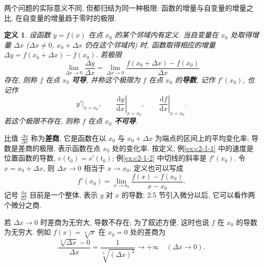 \documentclass[UTF8,openany]{ctexbook}
\theoremstyle{chinesetextbook}
\newtheorem{definition}{定义}[section]
\newcommand{\dd}{\mathrm d}
\begin{document}
\begin{center}
\end{center}
两个问题的实际意义不同, 但都归结为同一种极限: 函数的增量与自变量的增量之比, 在自变量的增量趋于零时的极限.
\begin{definition}
设函数 $y=f(x)$ 在点 $x_0$ 的某个邻域内有定义. 当自变量在 $x_0$ 处取得增量 $\Delta x$ ($\Delta x\ne0$, $x_0+\Delta x$ 仍在这个邻域内) 时, 函数取得相应的增量 $\Delta y=f(x_0+\Delta x)-f(x_0)$. 若极限
\[
\lim_{\Delta x\to0}\frac{\Delta y}{\Delta x}=\lim_{\Delta x\to0}\frac{f(x_0+\Delta x)-f(x_0)}{\Delta x}
\]
存在, 则称 $f$ 在点 $x_0$ \textbf{可导}, 并称这个极限为 $f$ 在点 $x_0$ 的\textbf{导数}, 记作 $f'(x_0)$, 也记作
\[
y'\big|_{x=x_0},\qquad\left.\frac{\dd y}{\dd x}\right|_{x=x_0},\qquad\left.\frac{\dd f}{\dd x}\right|_{x=x_0}.
\]
若这个极限不存在, 则称 $f$ 在点 $x_0$ \textbf{不可导}.
\end{definition}
比值 $\displaystyle\frac{\Delta y}{\Delta x}$ 称为\textbf{差商}, 它是函数在以 $x_0$ 与 $x_0+\Delta x$ 为端点的区间上的平均变化率; 导数是差商的极限, 表示函数在点 $x_0$ 处的变化率. 按定义, 例\ref{ex:c2-1-1} 中的速度是位置函数的导数, $v(t_0)=s'(t_0)$; 例\ref{ex:c2-1-2} 中切线的斜率是 $f'(x_0)$. 令 $x=x_0+\Delta x$, 则 $\Delta x\to0$ 相当于 $x\to x_0$, 定义也可以写成
\[
f'(x_0)=\lim_{x\to x_0}\frac{f(x)-f(x_0)}{x-x_0}.
\]
记号 $\displaystyle\frac{\dd y}{\dd x}$ 目前是一个整体, 表示 $y$ 对 $x$ 的导数; 2.5 节引入微分以后, 它可以看作两个微分之商.

若 $\Delta x\to0$ 时差商为无穷大, 导数不存在; 为了叙述方便, 这时也说 $f$ 在 $x_0$ 的导数为无穷大. 例如 $f(x)=\sqrt[3]x$ 在 $x_0=0$ 处的差商为
\[
\frac{\sqrt[3]{\Delta x}-0}{\Delta x}=\frac1{\sqrt[3]{(\Delta x)^2}}\to+\infty\quad(\Delta x\to0).
\]
\end{document}
